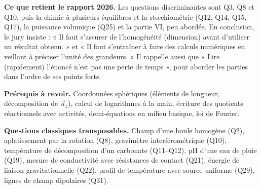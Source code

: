 \documentclass[11pt,a4paper]{article}
\begin{document}
\textbf{Ce que retient le rapport 2026.} Les questions discriminantes sont Q3, Q8 et Q10, puis la chimie à plusieurs équilibres et la stœchiométrie (Q12, Q14, Q15, Q17), la puissance volumique (Q25) et la partie VI, peu abordée. En conclusion, le jury insiste : « Il faut s'assurer de l'homogénéité (dimension) avant d'utiliser un résultat obtenu. » et « Il faut s'entraîner à faire des calculs numériques en veillant à préciser l'unité des grandeurs. » Il rappelle aussi que « Lire (rapidement) l'énoncé n'est pas une perte de temps », pour aborder les parties dans l'ordre de ses points forts.

\textbf{Prérequis à revoir.} Coordonnées sphériques (éléments de longueur, décomposition de \(\vec u_z\)), calcul de logarithmes à la main, écriture des quotients réactionnels avec activités, demi-équations en milieu basique, loi de Fourier.

\textbf{Questions classiques transposables.} Champ d'une boule homogène (Q2), aplatissement par la rotation (Q8), gravimètre interférométrique (Q10), température de décomposition d'un carbonate (Q11--Q12), pH d'une eau de pluie (Q19), mesure de conductivité avec résistances de contact (Q21), énergie de liaison gravitationnelle (Q22), profil de température avec source uniforme (Q29), lignes de champ dipolaires (Q31).
\end{document}
